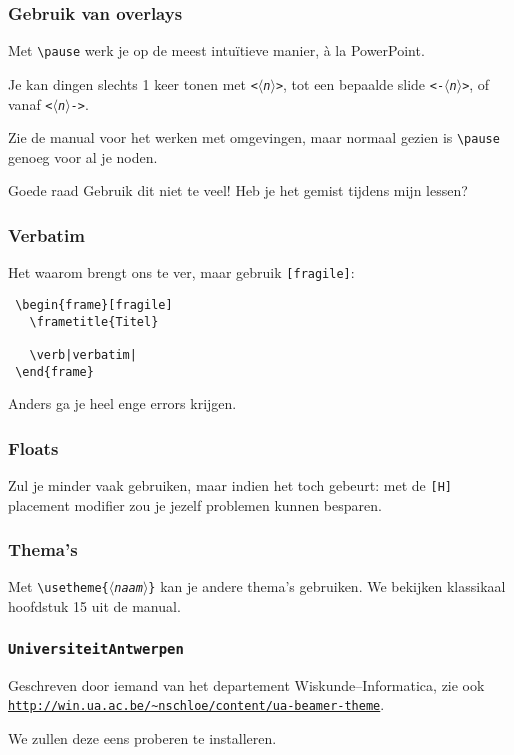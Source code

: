 \begin{frame}[fragile]
  \frametitle{Gebruik van overlays}

  Met \verb|\pause| werk je op de meest intu\"itieve manier, \`a la PowerPoint.

  Je kan dingen slechts 1 keer tonen met \texttt{<$\langle$\textsl{n}$\rangle$>}, tot een bepaalde slide \texttt{<-$\langle$\textsl{n}$\rangle$>}, of vanaf \texttt{<$\langle$\textsl{n}$\rangle$->}.

  Zie de manual voor het werken met omgevingen, maar normaal gezien is \verb|\pause| genoeg voor al je noden.

  \begin{alertblock}{Goede raad}
    Gebruik dit niet te veel! Heb je het gemist tijdens mijn lessen?
  \end{alertblock}
\end{frame}

\begin{frame}[fragile]
  \frametitle{Verbatim}

  Het waarom brengt ons te ver, maar gebruik \verb|[fragile]|:
  \begin{verbatim}
 \begin{frame}[fragile]
   \frametitle{Titel}

   \verb|verbatim|
 \end{frame}
  \end{verbatim}

  Anders ga je heel enge errors krijgen.
\end{frame}

\begin{frame}[fragile]
  \frametitle{Floats}

  Zul je minder vaak gebruiken, maar indien het toch gebeurt: met de \verb|[H]| placement modifier zou je jezelf problemen kunnen besparen.
\end{frame}

\begin{frame}
  \frametitle{Thema's}

  Met \texttt{\textcolor{uagreen}{\textbackslash usetheme}\{$\langle$\textsl{naam}$\rangle$\}} kan je andere thema's gebruiken. We bekijken klassikaal hoofdstuk 15 uit de manual.
\end{frame}

\begin{frame}
  \frametitle{\texttt{UniversiteitAntwerpen}}

  Geschreven door iemand van het departement Wiskunde--Informatica, zie ook \href{http://win.ua.ac.be/~nschloe/content/ua-beamer-theme}{\texttt{http://win.ua.ac.be/\textasciitilde nschloe/content/ua-beamer-theme}}.

  We zullen deze eens proberen te installeren.
\end{frame}
